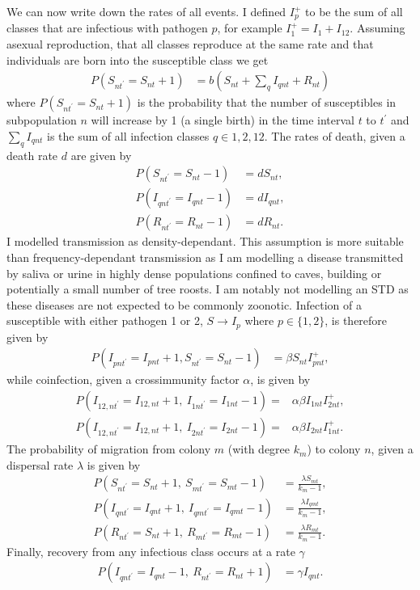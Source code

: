 We can now write down the rates of all events. 
I defined $I^+_p$ to be the sum of all classes that are infectious with pathogen $p$, for example $I^+_1 = I_1 + I_{12}$. 
Assuming asexual reproduction, that all classes reproduce at the same rate and that individuals are born into the susceptible class we get
\begin{align}
  P\left( S_{nt^\prime} = S_{nt} +1\right) &= b\left( S_{nt}+\sum_q I_{qnt} + R_{nt}\right) 
\end{align}
where $P\left( S_{nt^\prime} = S_{nt} +1\right)$ is the probability that the number of susceptibles in subpopulation $n$ will increase by 1 (a single birth) in the time interval $t$ to $t^\prime$ and $\sum_q I_{qnt}$ is the sum of all infection classes $q \in {1, 2, 12}$.
The rates of death, given a death rate $d$ are given by
\begin{align}
  P\left( S_{nt^\prime} = S_{nt}-1 \right) &= dS_{nt}, \\
  P\left( I_{qnt^\prime} = I_{qnt}-1 \right) &= dI_{qnt},\\
  P\left( R_{nt^\prime} = R_{nt}-1 \right) &= dR_{nt}.
\end{align}
I modelled transmission as density-dependant.
This assumption is more suitable than frequency-dependant transmission as I am modelling a disease transmitted by saliva or urine in highly dense populations confined to caves, building or potentially a small number of tree roosts.
I am notably not modelling an STD as these diseases are not expected to be commonly zoonotic.
Infection of a susceptible with either pathogen 1 or 2, $S \rightarrow I_p$ where $p\in \{1,2\}$, is therefore given by
\begin{align}
  P\left( I_{pnt^\prime} = I_{pnt}+1, S_{nt^\prime} = S_{nt}-1 \right) &= \beta S_{nt}I^+_{pnt},
\end{align}
while coinfection, given a crossimmunity factor $\alpha$, is given by
\begin{align}
  P\left( I_{12,nt^\prime} = I_{12,nt}+1,\: I_{1nt^\prime} = I_{1nt}-1\right) = &\alpha\beta I_{1nt}I^+_{2nt},\\
  P\left( I_{12,nt^\prime} = I_{12,nt}+1,\: I_{2nt^\prime} = I_{2nt}-1\right) = &\alpha\beta I_{2nt}I^+_{1nt}.
\end{align}
The probability of migration from colony $m$ (with degree $k_m$) to colony $n$, given a dispersal rate $\lambda$ is given by
\begin{align}
  P\left(S_{nt^\prime}=S_{nt}+1,\: S_{mt^\prime} = S_{mt}-1\right) &= \frac{\lambda S_{mt}}{k_m-1},\\
  P\left(I_{qnt^\prime}=I_{qnt}+1,\: I_{qmt^\prime} = I_{qmt}-1\right) &= \frac{\lambda I_{qmt}}{k_m-1},\\
  P\left(R_{nt^\prime}=S_{nt}+1,\: R_{mt^\prime} = R_{mt}-1\right) &= \frac{\lambda R_{mt}}{k_m-1}.
\end{align}
Finally, recovery from any infectious class occurs at a rate $\gamma$
\begin{align}
  P\left( I_{qnt^\prime} = I_{qnt}-1,\: R_{nt^\prime} = R_{nt}+1 \right) &= \gamma I_{qnt}.
\end{align}


